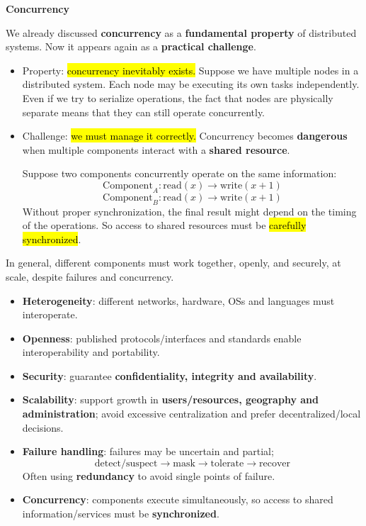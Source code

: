 \begin{flushleft}
    \textcolor{Red2}{ \textbf{Concurrency}}
\end{flushleft}
We already discussed \textbf{concurrency} as a \textbf{fundamental property} of distributed systems. Now it appears again as a \textbf{practical challenge}.
\begin{itemize}
    \item Property: \hl{concurrency inevitably exists.} Suppose we have multiple nodes in a distributed system. Each node may be executing its own tasks independently. Even if we try to serialize operations, the fact that nodes are physically separate means that they can still operate concurrently.
    \item Challenge: \hl{we must manage it correctly.} Concurrency becomes \textbf{dangerous} when multiple components interact with a \textbf{shared resource}.

        Suppose two components concurrently operate on the same information:
        \begin{equation*}
            \text{Component}_A:\text{read}(x)\rightarrow\text{write}(x+1)
        \end{equation*}
        \begin{equation*}
            \text{Component}_B:\text{read}(x)\rightarrow\text{write}(x+1)
        \end{equation*}
        Without proper synchronization, the final result might depend on the timing of the operations. So access to shared resources must be \hl{carefully synchronized}.
\end{itemize}

\highspace
\begin{takeawaysbox}
    In general, different components must work together, openly, and securely, at scale, despite failures and concurrency.
    \begin{itemize}
        \item \textbf{Heterogeneity}: different networks, hardware, OSs and languages must interoperate.
        \item \textbf{Openness}: published protocols/interfaces and standards enable interoperability and portability.
        \item \textbf{Security}: guarantee \textbf{confidentiality, integrity and availability}.
        \item \textbf{Scalability}: support growth in \textbf{users/resources, geography and administration}; avoid excessive centralization and prefer decentralized/local decisions.
        \item \textbf{Failure handling}: failures may be uncertain and partial;
            \begin{equation*}
                \text{detect/suspect} \rightarrow \text{mask} \rightarrow \text{tolerate} \rightarrow \text{recover}
            \end{equation*}
            Often using \textbf{redundancy} to avoid single points of failure.
        \item \textbf{Concurrency}: components execute simultaneously, so access to shared information/services must be \textbf{synchronized}.
    \end{itemize}
\end{takeawaysbox}